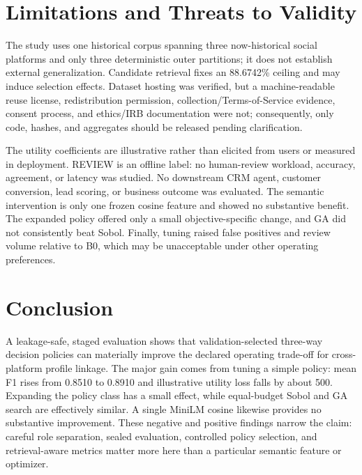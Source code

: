 \documentclass[conference]{IEEEtran}
\begin{document}
\section{Limitations and Threats to Validity}
The study uses one historical corpus spanning three now-historical social platforms and only three deterministic outer partitions; it does not establish external generalization. Candidate retrieval fixes an 88.6742\% ceiling and may induce selection effects. Dataset hosting was verified, but a machine-readable reuse license, redistribution permission, collection/Terms-of-Service evidence, consent process, and ethics/IRB documentation were not; consequently, only code, hashes, and aggregates should be released pending clarification.

The utility coefficients are illustrative rather than elicited from users or measured in deployment. REVIEW is an offline label: no human-review workload, accuracy, agreement, or latency was studied. No downstream CRM agent, customer conversion, lead scoring, or business outcome was evaluated. The semantic intervention is only one frozen cosine feature and showed no substantive benefit. The expanded policy offered only a small objective-specific change, and GA did not consistently beat Sobol. Finally, tuning raised false positives and review volume relative to B0, which may be unacceptable under other operating preferences.

\section{Conclusion}
A leakage-safe, staged evaluation shows that validation-selected three-way decision policies can materially improve the declared operating trade-off for cross-platform profile linkage. The major gain comes from tuning a simple policy: mean F1 rises from 0.8510 to 0.8910 and illustrative utility loss falls by about 500. Expanding the policy class has a small effect, while equal-budget Sobol and GA search are effectively similar. A single MiniLM cosine likewise provides no substantive improvement. These negative and positive findings narrow the claim: careful role separation, sealed evaluation, controlled policy selection, and retrieval-aware metrics matter more here than a particular semantic feature or optimizer.



\end{document}
